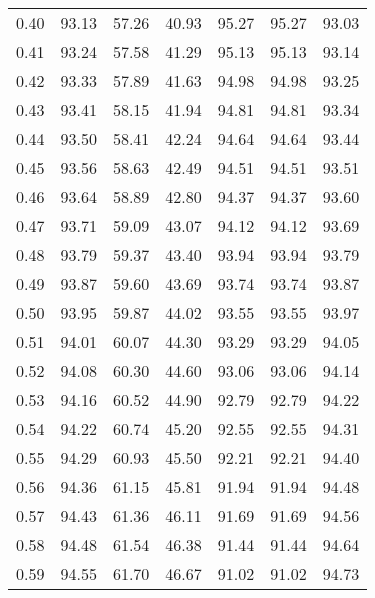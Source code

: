 \begin{tabular}{|c|c|c|c|c|c|c|}
      0.40 &     93.13 &     57.26 &      40.93 &   95.27 &      95.27 &         93.03 \\
      0.41 &     93.24 &     57.58 &      41.29 &   95.13 &      95.13 &         93.14 \\
      0.42 &     93.33 &     57.89 &      41.63 &   94.98 &      94.98 &         93.25 \\
      0.43 &     93.41 &     58.15 &      41.94 &   94.81 &      94.81 &         93.34 \\
      0.44 &     93.50 &     58.41 &      42.24 &   94.64 &      94.64 &         93.44 \\
      0.45 &     93.56 &     58.63 &      42.49 &   94.51 &      94.51 &         93.51 \\
      0.46 &     93.64 &     58.89 &      42.80 &   94.37 &      94.37 &         93.60 \\
      0.47 &     93.71 &     59.09 &      43.07 &   94.12 &      94.12 &         93.69 \\
      0.48 &     93.79 &     59.37 &      43.40 &   93.94 &      93.94 &         93.79 \\
      0.49 &     93.87 &     59.60 &      43.69 &   93.74 &      93.74 &         93.87 \\
      0.50 &     93.95 &     59.87 &      44.02 &   93.55 &      93.55 &         93.97 \\
      0.51 &     94.01 &     60.07 &      44.30 &   93.29 &      93.29 &         94.05 \\
      0.52 &     94.08 &     60.30 &      44.60 &   93.06 &      93.06 &         94.14 \\
      0.53 &     94.16 &     60.52 &      44.90 &   92.79 &      92.79 &         94.22 \\
      0.54 &     94.22 &     60.74 &      45.20 &   92.55 &      92.55 &         94.31 \\
      0.55 &     94.29 &     60.93 &      45.50 &   92.21 &      92.21 &         94.40 \\
      0.56 &     94.36 &     61.15 &      45.81 &   91.94 &      91.94 &         94.48 \\
      0.57 &     94.43 &     61.36 &      46.11 &   91.69 &      91.69 &         94.56 \\
      0.58 &     94.48 &     61.54 &      46.38 &   91.44 &      91.44 &         94.64 \\
      0.59 &     94.55 &     61.70 &      46.67 &   91.02 &      91.02 &         94.73 \\

\end{tabular}
